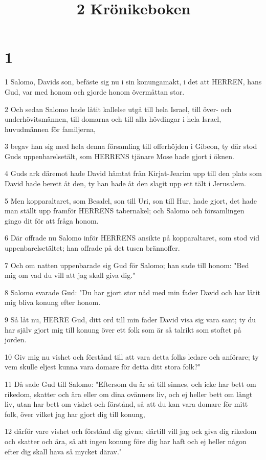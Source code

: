 

\title{2 Krönikeboken}


\chapter{1}

\par 1 Salomo, Davids son, befäste sig nu i sin konungamakt, i det att HERREN, hans Gud, var med honom och gjorde honom övermåttan stor.
\par 2 Och sedan Salomo hade låtit kallelse utgå till hela Israel, till över- och underhövitsmännen, till domarna och till alla hövdingar i hela Israel, huvudmännen för familjerna,
\par 3 begav han sig med hela denna församling till offerhöjden i Gibeon, ty där stod Guds uppenbarelsetält, som HERRENS tjänare Mose hade gjort i öknen.
\par 4 Guds ark däremot hade David hämtat från Kirjat-Jearim upp till den plats som David hade berett åt den, ty han hade åt den slagit upp ett tält i Jerusalem.
\par 5 Men kopparaltaret, som Besalel, son till Uri, son till Hur, hade gjort, det hade man ställt upp framför HERRENS tabernakel; och Salomo och församlingen gingo dit för att fråga honom.
\par 6 Där offrade nu Salomo inför HERRENS ansikte på kopparaltaret, som stod vid uppenbarelsetältet; han offrade på det tusen brännoffer.
\par 7 Och om natten uppenbarade sig Gud för Salomo; han sade till honom: "Bed mig om vad du vill att jag skall giva dig."
\par 8 Salomo svarade Gud: "Du har gjort stor nåd med min fader David och har låtit mig bliva konung efter honom.
\par 9 Så låt nu, HERRE Gud, ditt ord till min fader David visa sig vara sant; ty du har själv gjort mig till konung över ett folk som är så talrikt som stoftet på jorden.
\par 10 Giv mig nu vishet och förstånd till att vara detta folks ledare och anförare; ty vem skulle eljest kunna vara domare för detta ditt stora folk?"
\par 11 Då sade Gud till Salomo: "Eftersom du är så till sinnes, och icke har bett om rikedom, skatter och ära eller om dina ovänners liv, och ej heller bett om långt liv, utan har bett om vishet och förstånd, så att du kan vara domare för mitt folk, över vilket jag har gjort dig till konung,
\par 12 därför vare vishet och förstånd dig givna; därtill vill jag ock giva dig rikedom och skatter och ära, så att ingen konung före dig har haft och ej heller någon efter dig skall hava så mycket därav."
